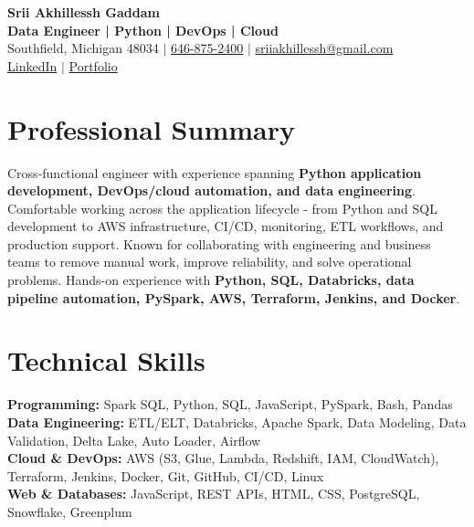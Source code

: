 \documentclass[letterpaper,10pt]{article}
\begin{document}
\fontsize{9.35pt}{10.45pt}\selectfont

\begin{center}
    {\LARGE \textbf{Srii Akhillessh Gaddam}} \\[-1pt]
    \textbf{Data Engineer | Python | DevOps | Cloud} \\[2pt]
    Southfield, Michigan 48034 $|$
    \href{tel:6468752400}{646-875-2400} $|$
    \href{mailto:sriiakhillessh@gmail.com}{sriiakhillessh@gmail.com} \\[1pt]
    \href{https://www.linkedin.com/in/srii-akhiilessh-gaddam-b48668191/}{LinkedIn} $|$
    \href{https://sriiakhillesshg.github.io/portfolio/}{Portfolio}
\end{center}
\vspace{-8pt}

\section{Professional Summary}
\small{Cross-functional engineer with experience spanning \textbf{Python application development, DevOps/cloud automation, and data engineering}. Comfortable working across the application lifecycle - from Python and SQL development to AWS infrastructure, CI/CD, monitoring, ETL workflows, and production support. Known for collaborating with engineering and business teams to remove manual work, improve reliability, and solve operational problems. Hands-on experience with \textbf{Python, SQL, Databricks, data pipeline automation, PySpark, AWS, Terraform, Jenkins, and Docker}.}

\section{Technical Skills}
\small{
\textbf{Programming:} Spark SQL, Python, SQL, JavaScript, PySpark, Bash, Pandas \\
\textbf{Data Engineering:} ETL/ELT, Databricks, Apache Spark, Data Modeling, Data Validation, Delta Lake, Auto Loader, Airflow \\
\textbf{Cloud \& DevOps:} AWS (S3, Glue, Lambda, Redshift, IAM, CloudWatch), Terraform, Jenkins, Docker, Git, GitHub, CI/CD, Linux \\
\textbf{Web \& Databases:} JavaScript, REST APIs, HTML, CSS, PostgreSQL, Snowflake, Greenplum
}

\end{document}
